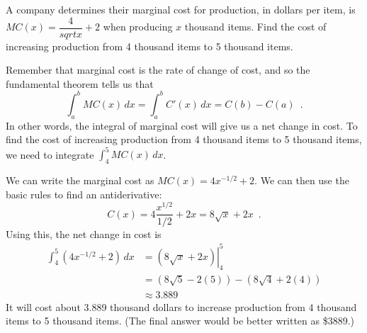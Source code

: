 \begin{example}
A company determines their marginal cost for production, in dollars per item, is $MC(x)=\dfrac{4}{sqrt{x}}+2$ when producing $x$ thousand items. Find the cost of increasing production from 4 thousand items to 5 thousand items.

\begin{solution}
  Remember that marginal cost is the rate of change of cost, and so the fundamental theorem tells us that
  $$\int_a^b MC(x)\, dx = \int_a^b C'(x)\, dx =C(b)-C(a) \enspace .$$
  In other words, the integral of marginal cost will give us a net change in cost. To find the cost of increasing production from 4 thousand items to 5 thousand items, we need to integrate $\int_4^5 MC(x)\, dx$.

We can write the marginal cost as $MC(x)=4x^{-1/2}+2$. We can then use the basic rules to find an antiderivative:
$$C(x) = 4\frac{x^{1/2}}{1/2} + 2x = 8\sqrt{x} + 2x\enspace .$$
Using this, the net change in cost is
\begin{align*}
  \int_4^5\left(4x^{-1/2}+2\right)\, dx &= \left.\left(8\sqrt{x} + 2x\right)\right|_4^5 \\
  &= (8\sqrt{5} - 2(5)) - (8\sqrt{4} +2(4))\\
  &\approx 3.889
\end{align*}
It will cost about 3.889 thousand dollars to increase production from 4 thousand items to 5 thousand items. (The final answer would be better written as \$3889.)
\end{solution}\end{example}

